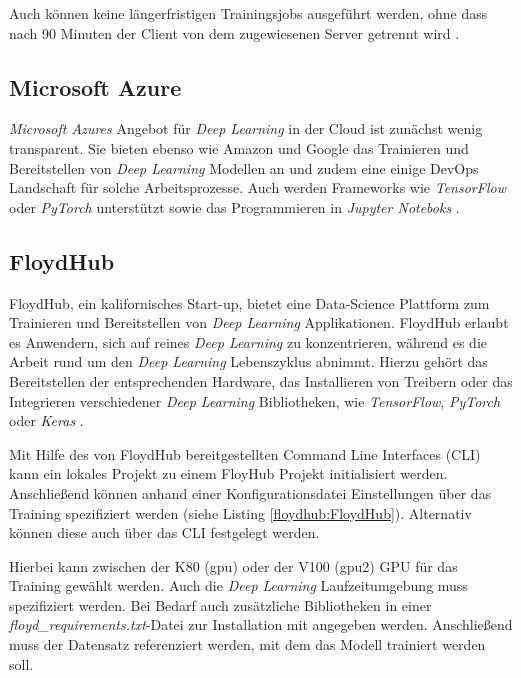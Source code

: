 Auch können keine längerfristigen Trainingsjobs ausgeführt werden, ohne dass nach 90 Minuten der Client von dem zugewiesenen Server getrennt wird \cite{GoogleCloud.20200314}.

\subsection*{Microsoft Azure}

\textit{Microsoft Azures} Angebot für \textit{Deep Learning} in der Cloud ist zunächst wenig transparent. Sie bieten ebenso wie Amazon und Google das Trainieren und Bereitstellen von \textit{Deep Learning} Modellen an und zudem eine einige DevOps Landschaft für solche Arbeitsprozesse. Auch werden Frameworks wie \textit{TensorFlow} oder \textit{PyTorch} unterstützt sowie das Programmieren in \textit{Jupyter Noteboks} \cite{MicrosoftAzure.20200314}.

\subsection*{FloydHub}

FloydHub, ein kalifornisches Start-up, bietet eine Data-Science Plattform zum Trainieren und Bereitstellen von \textit{Deep Learning} Applikationen. FloydHub erlaubt es Anwendern, sich auf reines \textit{Deep Learning} zu konzentrieren, während es die Arbeit rund um den \textit{Deep Learning} Lebenszyklus abnimmt. Hierzu gehört das Bereitstellen der entsprechenden Hardware, das Installieren von Treibern oder das Integrieren verschiedener \textit{Deep Learning} Bibliotheken, wie \textit{TensorFlow}, \textit{PyTorch} oder \textit{Keras} \cite{FloydHub.20200215}. 

Mit Hilfe des von FloydHub bereitgestellten Command Line Interfaces (CLI) kann ein lokales Projekt zu einem FloyHub Projekt initialisiert werden. Anschließend können anhand einer Konfigurationsdatei Einstellungen über das Training spezifiziert werden (siehe Listing \ref{floydhub:FloydHub}). Alternativ können diese auch über das CLI festgelegt werden. 

\lstset{language=XML}


Hierbei kann zwischen der K80 (gpu) oder der V100 (gpu2) GPU für das Training gewählt werden. Auch die \textit{Deep Learning} Laufzeitumgebung muss spezifiziert werden. Bei Bedarf auch zusätzliche Bibliotheken in einer \textit{floyd\_requirements.txt}-Datei zur Installation mit angegeben werden. Anschließend muss der Datensatz referenziert werden, mit dem das Modell trainiert werden soll. 

